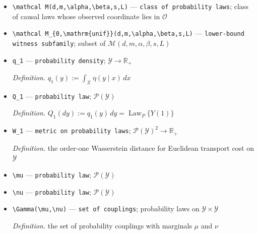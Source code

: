 \documentclass{article}
\begin{document}
\begin{itemize}
  \par\smallskip\noindent\emph{Definition.} derivatives through order \(\lceil s\rceil-1\) are bounded by \(L\), and derivatives of that order are Hölder of exponent \(s-\lceil s\rceil+1\); integer \(s\) means Lipschitz derivatives of order \(s-1\)
  \item \texttt{\textbackslash{}\allowbreak{}mathcal M(d,\allowbreak{}m,\allowbreak{}\textbackslash{}\allowbreak{}alpha,\allowbreak{}\textbackslash{}\allowbreak{}beta,\allowbreak{}s,\allowbreak{}L)} --- \texttt{class of probability laws}; class of causal laws whose observed coordinate lies in \(\mathcal O\)
  \item \texttt{\textbackslash{}\allowbreak{}mathcal M\_\allowbreak{}\{0,\allowbreak{}\textbackslash{}\allowbreak{}mathrm\{unif\}\allowbreak{}\}\allowbreak{}(d,\allowbreak{}m,\allowbreak{}\textbackslash{}\allowbreak{}alpha,\allowbreak{}\textbackslash{}\allowbreak{}beta,\allowbreak{}s,\allowbreak{}L)} --- \texttt{lower-\allowbreak{}bound witness subfamily}; subset of \(\mathcal M(d,m,\alpha,\beta,s,L)\)
  \item \texttt{q\_\allowbreak{}1} --- \texttt{probability density}; \(\mathcal Y\to\mathbb R_+\)
  \par\smallskip\noindent\emph{Definition.} \(q_1(y):=\int_{\mathcal X}\eta(y\mid x)\,dx\)
  \item \texttt{Q\_\allowbreak{}1} --- \texttt{probability law}; \(\mathcal P(\mathcal Y)\)
  \par\smallskip\noindent\emph{Definition.} \(Q_1(dy):=q_1(y)\,dy=\operatorname{Law}_P\{Y(1)\}\)
  \item \texttt{W\_\allowbreak{}1} --- \texttt{metric on probability laws}; \(\mathcal P(\mathcal Y)^2\to\mathbb R_+\)
  \par\smallskip\noindent\emph{Definition.} the order-one Wasserstein distance for Euclidean transport cost on \(\mathcal Y\)
  \item \texttt{\textbackslash{}\allowbreak{}mu} --- \texttt{probability law}; \(\mathcal P(\mathcal Y)\)
  \item \texttt{\textbackslash{}\allowbreak{}nu} --- \texttt{probability law}; \(\mathcal P(\mathcal Y)\)
  \item \texttt{\textbackslash{}\allowbreak{}Gamma(\textbackslash{}\allowbreak{}mu,\allowbreak{}\textbackslash{}\allowbreak{}nu)} --- \texttt{set of couplings}; probability laws on \(\mathcal Y\times\mathcal Y\)
  \par\smallskip\noindent\emph{Definition.} the set of probability couplings with marginals \(\mu\) and \(\nu\)

\end{itemize}
\end{document}
